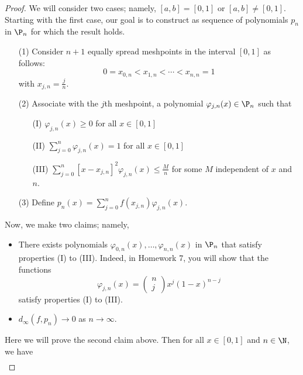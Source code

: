 \begin{proof}
    We will consider two cases; namely, \( [a,b] = [0,1] \) or \( [a,b] \neq [0,1] \). Starting with the first case, our goal is to construct as sequence of polynomials \( {p}_{n} \) in \( {\P}_{n} \) for which the result holds. 
    \begin{enumerate}
        \item[(1)] Consider \( n + 1  \) equally spread meshpoints in the interval \( [0,1] \) as follows:
            \[  0  = {x}_{0,n} < {x}_{1,n} < \cdots < {x}_{n,n} = 1  \]
            with \( {x}_{j,n} = \frac{ j  }{ n }  \).
        \item[(2)] Associate with the \( j \)th meshpoint, a polynomial \( \varphi_{j,n}(x) \in {\P}_{n} \) such that 
            \begin{enumerate}
                \item[(I)] \( {\varphi}_{j,n}(x) \geq 0  \) for all \( x \in [0,1] \) 
                \item[(II)] \( \displaystyle \sum_{ j = 0  }^{ n } {\varphi}_{j,n}(x) = 1  \) for all \( x \in [0,1] \)
                \item[(III)] \( \displaystyle \sum_{ j=0  }^{ n } [x - {x}_{j,n}]^{2} {\varphi}_{j,n}(x) \leq \displaystyle \frac{ M }{ n } \) for some \( M  \) independent of \( x  \) and \( n  \).
            \end{enumerate}
        \item[(3)] Define \( {p}_{n}(x) = \displaystyle \sum_{ j = 0  }^{ n } f({x}_{j,n}) {\varphi}_{j,n} (x)   \).
    \end{enumerate}
    Now, we make two claims; namely, 
    \begin{itemize}
        \item There exists polynomials \( {\varphi}_{0,n}(x), \dots, {\varphi}_{n,n}(x) \) in \( {\P}_{n} \) that satisfy properties (I) to (III). Indeed, in Homework 7, you will show that the functions
            \[ {\varphi}_{j,n}(x) = \begin{pmatrix} n \\ j  \end{pmatrix}  x^{j} (1 - x )^{n-j}  \]
            satisfy properties (I) to (III).
        \item \( {d}_{\infty}(f, {p}_{n}) \to 0  \) as \( n \to \infty   \). 
    \end{itemize}
    Here we will prove the second claim above. Then for all \( x \in [0,1] \) and \( n \in \N \), we have 
    \begin{align*}

\end{align*}
\end{proof}

